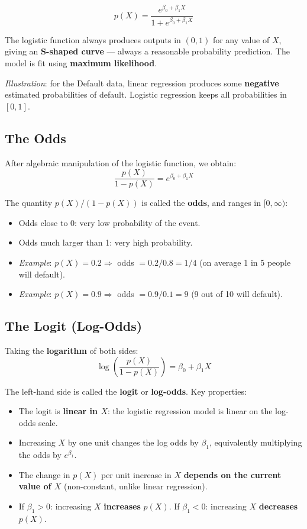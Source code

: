 \documentclass[11pt,a4paper]{article}
\theoremstyle{definition}
\theoremstyle{plain}
\theoremstyle{remark}
\begin{document}
\begin{tcolorbox}[colback=blue!5!white,colframe=blue!75!black,title=\textbf{The Logistic Function}]
\[
    p(X) = \frac{e^{\beta_0 + \beta_1 X}}{1 + e^{\beta_0 + \beta_1 X}}
\]
\end{tcolorbox}

The logistic function always produces outputs in $(0, 1)$ for any value of $X$, giving an \textbf{S-shaped curve} — always a reasonable probability prediction. The model is fit using \textbf{maximum likelihood}.

\textit{Illustration}: for the Default data, linear regression produces some \textbf{negative} estimated probabilities of default. Logistic regression keeps all probabilities in $[0,1]$.

\subsection{The Odds}

After algebraic manipulation of the logistic function, we obtain:
\[
    \frac{p(X)}{1 - p(X)} = e^{\beta_0 + \beta_1 X}
\]

The quantity $p(X) / (1 - p(X))$ is called the \textbf{odds}, and ranges in $[0, \infty)$:
\begin{itemize}
    \item Odds close to 0: very low probability of the event.
    \item Odds much larger than 1: very high probability.
    \item \textit{Example}: $p(X) = 0.2 \Rightarrow$ odds $= 0.2/0.8 = 1/4$ (on average 1 in 5 people will default).
    \item \textit{Example}: $p(X) = 0.9 \Rightarrow$ odds $= 0.9/0.1 = 9$ (9 out of 10 will default).
\end{itemize}

\subsection{The Logit (Log-Odds)}

Taking the \textbf{logarithm} of both sides:
\[
    \log\!\left(\frac{p(X)}{1 - p(X)}\right) = \beta_0 + \beta_1 X
\]

The left-hand side is called the \textbf{logit} or \textbf{log-odds}. Key properties:
\begin{itemize}
    \item The logit is \textbf{linear in $X$}: the logistic regression model is linear on the log-odds scale.
    \item Increasing $X$ by one unit changes the log odds by $\beta_1$, equivalently multiplying the odds by $e^{\beta_1}$.
    \item The change in $p(X)$ per unit increase in $X$ \textbf{depends on the current value of $X$} (non-constant, unlike linear regression).
    \item If $\beta_1 > 0$: increasing $X$ \textbf{increases} $p(X)$. If $\beta_1 < 0$: increasing $X$ \textbf{decreases} $p(X)$.
\end{itemize}
\end{document}
